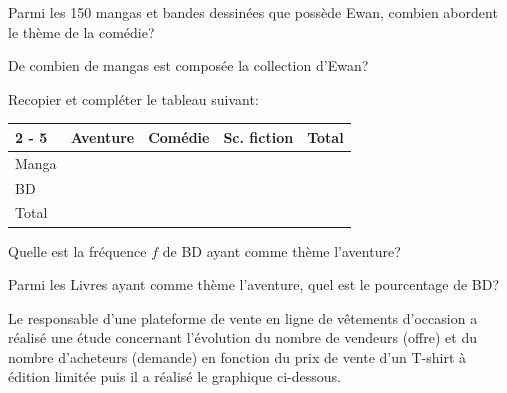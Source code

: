\documentclass[11pt,a4paper]{article}  %
\begin{document}
\begin{enumMet}
	\item Parmi les 150 mangas et bandes dessinées que possède Ewan, combien abordent le thème de la comédie?
	\item De combien de mangas est composée la collection d'Ewan?
	\item Recopier et compléter le tableau suivant:
	
	\begin{tabular}{|l|l|l|l|l|}
		\cline { 2 - 5 } \multicolumn{1}{c|}{} & Aventure & Comédie & Sc. fiction & Total \\
		\hline Manga & & & & \\
		\hline BD & & & & \\
		\hline Total & & & & \\
		\hline
	\end{tabular}
	\item Quelle est la fréquence $f$ de BD ayant comme thème l'aventure?
	\item Parmi les Livres ayant comme thème l'aventure, quel est le pourcentage de BD?\\
\end{enumMet}


\newpage
\exerciceDS{}

Le responsable d'une plateforme de vente en ligne de vêtements d'occasion a réalisé une étude concernant l'évolution du nombre de vendeurs (offre) et du nombre d'acheteurs (demande) en fonction du prix de vente d'un T-shirt à édition limitée puis il a réalisé le graphique ci-dessous.
\ \\

\begin{center}
\end{center} 
\end{document}
